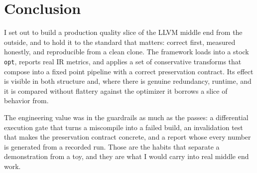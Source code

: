 \section{Conclusion}

I set out to build a production quality slice of the LLVM middle end from the
outside, and to hold it to the standard that matters: correct first, measured
honestly, and reproducible from a clean clone. The framework loads into a stock
\texttt{opt}, reports real IR metrics, and applies a set of conservative
transforms that compose into a fixed point pipeline with a correct preservation
contract. Its effect is visible in both structure and, where there is genuine
redundancy, runtime, and it is compared without flattery against the optimizer it
borrows a slice of behavior from.

The engineering value was in the guardrails as much as the passes: a differential
execution gate that turns a miscompile into a failed build, an invalidation test
that makes the preservation contract concrete, and a report whose every number is
generated from a recorded run. Those are the habits that separate a demonstration
from a toy, and they are what I would carry into real middle end work.

